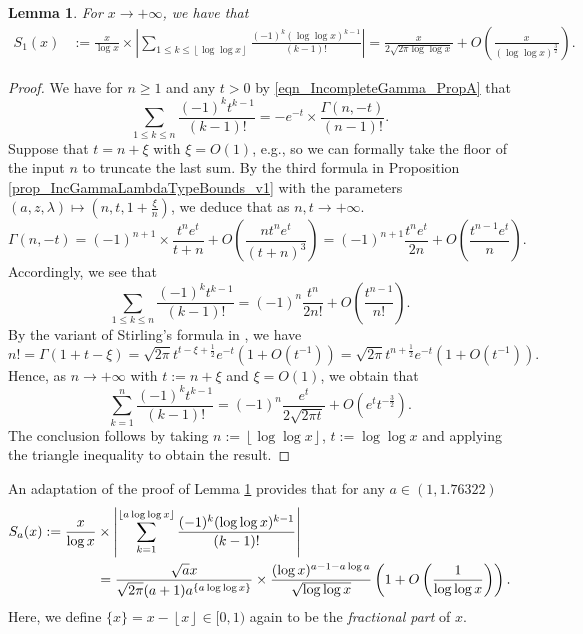 \documentclass[11pt,reqno,a4letter]{article}
\numberwithin{figure}{section}
\numberwithin{table}{section}
\newcommand{\cf}{\textit{cf.\ }}
\newcommand{\floor}[1]{\left\lfloor #1 \right\rfloor}
\theoremstyle{plain}
\newtheorem{lemma}[theorem]{Lemma}
\numberwithin{theorem}{section}
\theoremstyle{definition}
\begin{document}
\begin{lemma}
\label{lemma_ConvenientIncGammaFuncTypePartialSumAsymptotics_v2}
For $x \rightarrow +\infty$, we have that 
\begin{align*}
S_1(x) & := \frac{x}{\log x} \times \left\lvert \sum_{1 \leq k \leq \floor{\log\log x}} 
     \frac{(-1)^k (\log\log x)^{k-1}}{(k-1)!} \right\rvert 
     = \frac{x}{2\sqrt{2\pi \log\log x}} + O\left(\frac{x}{(\log\log x)^{\frac{3}{2}}}\right). 
\end{align*}
\end{lemma}
\begin{proof}
We have for $n \geq 1$ and any $t > 0$ by 
\eqref{eqn_IncompleteGamma_PropA} that 
\[
\sum_{1 \leq k \leq n} \frac{(-1)^k t^{k-1}}{(k-1)!} = -e^{-t} \times 
     \frac{\Gamma(n, -t)}{(n-1)!}. 
\]
Suppose that $t = n + \xi$ with $\xi = O(1)$, e.g., so we can 
formally take the floor of the input $n$ to truncate the last sum. 
By the third formula 
in Proposition \ref{prop_IncGammaLambdaTypeBounds_v1} 
with the parameters $(a, z, \lambda) \mapsto \left(n, t, 1 + \frac{\xi}{n}\right)$, 
we deduce that as $n,t \rightarrow +\infty$. 
\begin{equation}
\label{eqn_ProofTag_lemma_ConvenientIncGammaFuncTypePartialSumAsymptotics_v2}
\Gamma(n, -t) = (-1)^{n+1} \times \frac{t^n e^{t}}{t+n} + 
     O\left(\frac{n t^n e^{t}}{(t+n)^3}\right) = 
     (-1)^{n+1} \frac{t^n e^t}{2n} + O\left(\frac{t^{n-1} e^t}{n}\right). 
\end{equation}
Accordingly, we see that 
\[
\sum_{1 \leq k \leq n} \frac{(-1)^k t^{k-1}}{(k-1)!} = 
     (-1)^{n} \frac{t^n}{2n!} + O\left(\frac{t^{n-1}}{n!}\right). 
\]
By the variant of Stirling's formula in \cite[\cf Eq.\ (5.11.8)]{NISTHB}, we have 
\[
n! = \Gamma(1 + t - \xi) = \sqrt{2\pi} t^{t-\xi+\frac{1}{2}} e^{-t} \left(1 + O\left(t^{-1}\right)\right) = 
     \sqrt{2\pi} t^{n+\frac{1}{2}} e^{-t} \left(1 + O\left(t^{-1}\right)\right). 
\]
Hence, as $n \rightarrow +\infty$ with $t := n + \xi$ and $\xi = O(1)$, we obtain that 
\[
\sum_{k=1}^{n} \frac{(-1)^k t^{k-1}}{(k-1)!} = (-1)^n \frac{e^t}{2 \sqrt{2\pi t}} + 
     O\left(e^t t^{-\frac{3}{2}}\right). 
\]
The conclusion follows by taking $n := \floor{\log\log x}$, 
$t := \log\log x$ and applying the triangle inequality 
to obtain the result. 
\end{proof}

An adaptation of the proof of Lemma \ref{lemma_ConvenientIncGammaFuncTypePartialSumAsymptotics_v2} 
provides that for any $a \in (1, 1.76322)$ 
\begin{align}
\notag 
S_a(x) := 
     \frac{x}{\log x} & \times \left\lvert \sum_{k=1}^{\floor{a\log\log x}} \frac{(-1)^{k} (\log\log x)^{k-1}}{(k-1)!} 
     \right\rvert \\ 
\label{eqn_ConvenientIncGammaFuncTypePartialSumAsymptotics_va3} 
     & = \frac{\sqrt{a} x}{\sqrt{2\pi}(a+1) a^{\{a\log\log x\}}} 
     \times \frac{(\log x)^{a-1-a\log a}}{\sqrt{\log\log x}} 
     \left(1 + O\left(\frac{1}{\log\log x}\right)\right). 
\end{align}
Here, we define $\{x\} = x - \floor{x} \in [0, 1)$ again to be the \emph{fractional part} of $x$.
\end{document}
